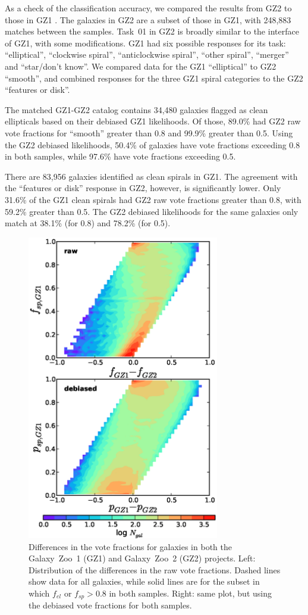 \documentclass[useAMS,usenatbib]{mn2e}
\begin{document}
As a check of the classification accuracy, we compared the results from GZ2 to those in GZ1 \citep{lin11}. The galaxies in GZ2 are a subset of those in GZ1, with 248,883 matches between the samples. Task~01 in GZ2 is broadly similar to the interface of GZ1, with some modifications. GZ1 had six possible responses for its task: ``elliptical'', ``clockwise spiral'', ``anticlockwise spiral'', ``other spiral'', ``merger'' and ``star/don't know''. We compared data for the GZ1 ``elliptical'' to GZ2 ``smooth'', and combined responses for the three GZ1 spiral categories to the GZ2 ``features or disk''. 

The matched GZ1-GZ2 catalog contains 34,480 galaxies flagged as clean ellipticals based on their debiased GZ1 likelihoods. Of those, 89.0\% had GZ2 raw vote fractions for ``smooth'' greater than 0.8 and 99.9\% greater than 0.5. Using the GZ2 debiased likelihoods, 50.4\% of galaxies have vote fractions exceeding 0.8 in both samples, while 97.6\% have vote fractions exceeding 0.5. 

There are 83,956 galaxies identified as clean spirals in GZ1. The agreement with the ``features or disk'' response in GZ2, however, is significantly lower. Only 31.6\% of the GZ1 clean spirals had GZ2 raw vote fractions greater than 0.8, with 59.2\% greater than 0.5. The GZ2 debiased likelihoods for the same galaxies only match at 38.1\% (for 0.8) and 78.2\% (for 0.5). 

\begin{figure}
\includegraphics[angle=0,width=3.3in]{figures/gz1_gz2_trumpet.eps}
\caption{Differences in the vote fractions for galaxies in both the Galaxy~Zoo~1 (GZ1) and Galaxy~Zoo~2 (GZ2) projects. Left: Distribution of the differences in the raw vote fractions. Dashed lines show data for all galaxies, while solid lines are for the subset in which $f_{el}$ or $f_{sp} > 0.8$ in both samples. Right: same plot, but using the debiased vote fractions for both samples. 
\label{fig-trumpet}}
\end{figure}
\end{document}
